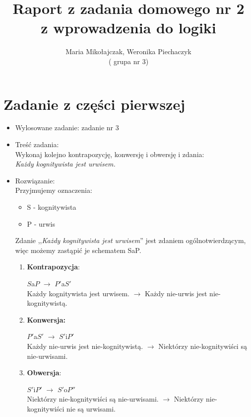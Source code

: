 \documentclass[12pt]{article}
\title{{\bfseries Raport z zadania domowego nr 2}\\ {\Large z wprowadzenia do logiki}}
\author{Maria Mikołajczak, Weronika Piechaczyk \\( grupa nr 3)}
\begin{document}
	\maketitle
	\section{Zadanie z części pierwszej}
	\begin{itemize}
		\item	Wylosowane zadanie: zadanie nr 3
		\item Treść zadania: \vspace{0.5em} \\ Wykonaj kolejno kontrapozycję, konwersję i obwersję i zdania: \\
		\textit{Każdy kognitywista jest urwisem.}
		\item Rozwiązanie:\\
		 Przyjmujemy oznaczenia:
		\begin{itemize}
			\item S - kognitywista
			\item P - urwis
		\end{itemize}
	Zdanie ,,\textit{Każdy kognitywista jest urwisem}'' jest zdaniem ogólnotwierdzącym, więc możemy zastąpić je schematem SaP. 
		\begin{enumerate}
			\item \textbf{Kontrapozycja}:
			
			$S$a$P$ $\rightarrow$ $P'$a$S'$\\
			Każdy kognitywista jest urwisem. $\rightarrow$ Każdy nie-urwis jest nie-kognitywistą.
			\item \textbf{Konwersja:}
			
			$P'$a$S'$ $\rightarrow$ $S'$i$P'$ \\
			Każdy nie-urwis jest nie-kognitywistą. $\rightarrow$ Niektórzy nie-kognitywiści są nie-urwisami.
			\item \textbf{Obwersja}:
			
			$S'$i$P'$ $\rightarrow$ $S'$o$P''$\\
			Niektórzy nie-kognitywiści są nie-urwisami. $\rightarrow$ Niektórzy nie-kognitywiści nie są urwisami.
			
		\end{enumerate}
	\end{itemize}
\end{document}
